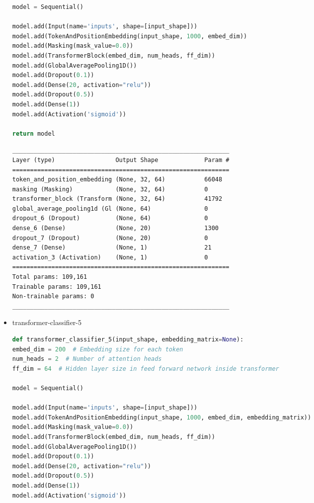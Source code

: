 \documentclass{article}
\begin{document}
\begin{itemize}
\begin{lstlisting}[language=Python, caption=Дефиниция на transformer-classifier-4.]
model = Sequential()

model.add(Input(name='inputs', shape=[input_shape]))
model.add(TokenAndPositionEmbedding(input_shape, 1000, embed_dim))
model.add(Masking(mask_value=0.0))
model.add(TransformerBlock(embed_dim, num_heads, ff_dim))
model.add(GlobalAveragePooling1D())
model.add(Dropout(0.1))
model.add(Dense(20, activation="relu"))
model.add(Dropout(0.5))
model.add(Dense(1))
model.add(Activation('sigmoid'))

return model
\end{lstlisting}

\begin{lstlisting}[numbers=none, caption=Обобщение на transformer-classifier-4.]
_____________________________________________________________
Layer (type)                 Output Shape             Param #
=============================================================
token_and_position_embedding (None, 32, 64)           66048
masking (Masking)            (None, 32, 64)           0
transformer_block (Transform (None, 32, 64)           41792
global_average_pooling1d (Gl (None, 64)               0
dropout_6 (Dropout)          (None, 64)               0
dense_6 (Dense)              (None, 20)               1300
dropout_7 (Dropout)          (None, 20)               0
dense_7 (Dense)              (None, 1)                21
activation_3 (Activation)    (None, 1)                0
=============================================================
Total params: 109,161
Trainable params: 109,161
Non-trainable params: 0
_____________________________________________________________
\end{lstlisting}

\item transformer-classifier-5

\begin{lstlisting}[language=Python, caption=Дефиниция на transformer-classifier-5.]
def transformer_classifier_5(input_shape, embedding_matrix=None):
embed_dim = 200  # Embedding size for each token
num_heads = 2  # Number of attention heads
ff_dim = 64  # Hidden layer size in feed forward network inside transformer

model = Sequential()

model.add(Input(name='inputs', shape=[input_shape]))
model.add(TokenAndPositionEmbedding(input_shape, 1000, embed_dim, embedding_matrix))
model.add(Masking(mask_value=0.0))
model.add(TransformerBlock(embed_dim, num_heads, ff_dim))
model.add(GlobalAveragePooling1D())
model.add(Dropout(0.1))
model.add(Dense(20, activation="relu"))
model.add(Dropout(0.5))
model.add(Dense(1))
model.add(Activation('sigmoid'))


\end{lstlisting}
\end{itemize}
\end{document}
